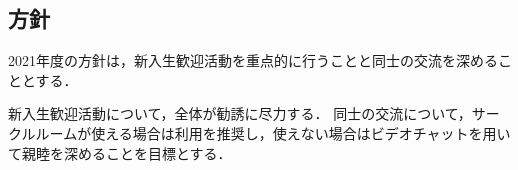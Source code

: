 \subsection*{\newGradeIfKouki{}\secondGrade{}方針}


2021年度の\newGradeIfKouki{}\secondGrade{}方針は，新入生歓迎活動を重点的に行うことと\secondGrade{}同士の交流を深めることとする．

新入生歓迎活動について，\secondGrade{}全体が勧誘に尽力する．
\secondGrade{}同士の交流について，サークルルームが使える場合は利用を推奨し，使えない場合はビデオチャットを用いて親睦を深めることを目標とする．